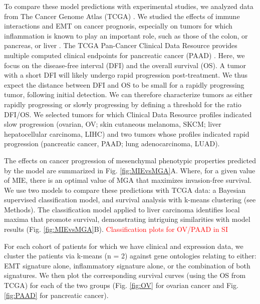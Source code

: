 \documentclass[11pt]{article}
\newcommand{\tcr} { \textcolor{red} }
\begin{document}
\par
To compare these model predictions with experimental studies, we analyzed data from The Cancer Genome Atlas (TCGA) \cite{Weinstein}. We studied the effects of immune interactions and EMT on cancer prognosis, especially on tumors for which inflammation is known to play an important role, such as those of the colon, or pancreas, or liver  \cite{greten2019inflammation,hu2010inflammation}.
The TCGA Pan-Cancer Clinical Data Resource provides multiple computed clinical endpoints for pancreatic cancer (PAAD) \cite{liu2018integrated}.
Here, we focus on the disease-free interval (DFI) and the overall survival (OS). A tumor with a short DFI will likely undergo rapid progression post-treatment. We thus expect the distance between DFI and OS to be small for a rapidly progressing tumor, following initial detection. We can therefore characterize tumors as either rapidly progressing or slowly progressing by defining a threshold for the ratio DFI/OS. We selected tumors for which Clinical Data Resource profiles indicated slow progression (ovarian, OV; skin cutaneous melanoma, SKCM; liver hepatocellular carcinoma, LIHC) and two tumors whose profiles indicated rapid progression (pancreatic cancer, PAAD; lung adenocarcinoma, LUAD).
\par
The effects on cancer progression of mesenchymal phenotypic properties predicted by the model are summarized in Fig. \ref{fig:MIEvsMGA}A. Where, %
for a given value of MIE, there is an optimal value of MGA that maximizes invasion-free survival. %
We use two models to compare these predictions with TCGA data: a Bayesian supervised classification model, and survival analysis with k-means clustering (see Methods). The classification model applied to liver carcinoma identifies local maxima that promote survival, demonstrating intriguing similarities with model results (Fig.  \ref{fig:MIEvsMGA}B). \tcr{Classification plots for OV/PAAD in SI}
\par
For each cohort of patients for which we have clinical and expression data, we cluster the patients via k-means (n = 2) against gene ontologies relating to either: EMT signature alone, inflammatory signature alone, or the combination of both signatures. We then plot the corresponding survival curves (using the OS from TCGA) for each of the two groups (Fig.  \ref{fig:OV} for ovarian cancer and Fig. \ref{fig:PAAD} for pancreatic cancer).
\end{document}
